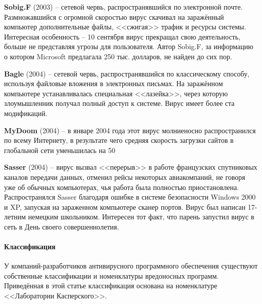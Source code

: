 \textbf{Sobig.F} (2003) -- сетевой червь, распространявшийся по электронной
почте. Размножавшийся с огромной скоростью вирус скачивал на заражённый
компьютер дополнительные файлы, <<сжигая>> трафик и ресурсы системы.
Интересная особенность -- 10 сентября вирус прекращал свою деятельность,
больше не представляя угрозы для пользователя. Автор Sobig.F, за информацию о
котором Microsoft предлагала 250 тыс. долларов, не найден до сих пор.

\textbf{Bagle} (2004) -- сетевой червь, распространявшийся по классическому
способу, используя файловые вложения в электронных письмах. На заражённом
компьютере устанавливалась специальная <<лазейка>>, через которую
злоумышленник получал полный доступ к системе. Вирус имеет более ста
модификаций.

\textbf{MyDoom} (2004) -- в январе 2004 года этот вирус молниеносно распространился по всему Интернету, в результате чего средняя скорость загрузки сайтов в глобальной сети уменьшилась на 50%

\textbf{Sasser} (2004) -- вирус вызвал <<перерыв>> в работе французских
спутниковых каналов передачи данных, отменил рейсы некоторых авиакомпаний, не
говоря уже об обычных компьютерах, чья работа была полностью приостановлена.
Распространялся Sasser благодаря ошибке в системе безопасности Windows 2000 и
XP, запуская на зараженном компьютере сканер портов. Вирус был написан
17-летним немецким школьником. Интересен тот факт, что парень запустил вирус
в сеть в День своего совершеннолетия.
%
\paragraph{Классификация}
У компаний-разработчиков антивирусного программного обеспечения существуют
собственные классификации и номенклатуры вредоносных программ. Приведённая в
этой статье классификация основана на номенклатуре <<Лаборатории
Касперского>>.

